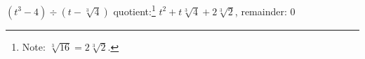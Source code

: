 {$(t^3 - 4) \div (t - \sqrt[3]{4})$}
{quotient:\footnote{Note: $\sqrt[3]{16} = 2\sqrt[3]{2}$.} $t^2 + t \sqrt[3]{4} + 2\sqrt[3]{2}$, remainder: $0$}